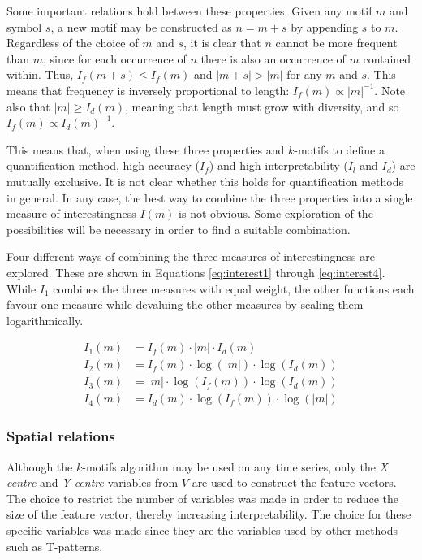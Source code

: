 \documentclass[conference,a4paper,twoside]{IEEEtran}
\begin{document}
Some important relations hold between these properties. Given any motif $m$ and symbol $s$, a new motif may be constructed as $n = m + s$ by appending $s$ to $m$. Regardless of the choice of $m$ and $s$, it is clear that $n$ cannot be more frequent than $m$, since for each occurrence of $n$ there is also an occurrence of $m$ contained within. Thus, $I_f(m+s) \leq I_f(m)$ and $|m+s| > |m|$ for any $m$ and $s$. This means that frequency is inversely proportional to length: $I_f(m) \propto |m|^{-1}$. Note also that $|m| \geq I_d(m)$, meaning that length must grow with diversity, and so $I_f(m) \propto I_d(m)^{-1}$.

This means that, when using these three properties and $k$-motifs to define a quantification method, high accuracy ($I_f$) and high interpretability ($I_l$ and $I_d$) are mutually exclusive. It is not clear whether this holds for quantification methods in general. In any case, the best way to combine the three properties into a single measure of interestingness $I(m)$ is not obvious. Some exploration of the possibilities will be necessary in order to find a suitable combination.

Four different ways of combining the three measures of interestingness are explored. These are shown in Equations \ref{eq:interest1} through \ref{eq:interest4}. While $I_1$ combines the three measures with equal weight, the other functions each favour one measure while devaluing the other measures by scaling them logarithmically.

\begin{align}
    I_1(m) & = I_f(m) \cdot |m| \cdot I_d(m) \label{eq:interest1} \\
    I_2(m) & = I_f(m) \cdot \log(|m|) \cdot \log(I_d(m)) \label{eq:interest2} \\
    I_3(m) & = |m| \cdot \log(I_f(m)) \cdot \log(I_d(m)) \label{eq:interest3} \\
    I_4(m) & = I_d(m) \cdot \log(I_f(m)) \cdot \log(|m|) \label{eq:interest4}
\end{align}

\subsubsection{Spatial relations}
Although the $k$-motifs algorithm may be used on any time series, only the \emph{X centre} and \emph{Y centre} variables from $V$ are used to construct the feature vectors. The choice to restrict the number of variables was made in order to reduce the size of the feature vector, thereby increasing interpretability. The choice for these specific variables was made since they are the variables used by other methods such as T-patterns.
\end{document}
